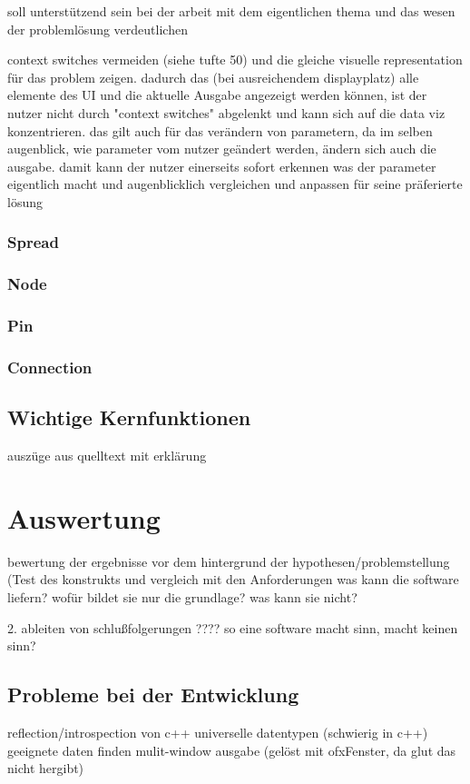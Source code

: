 \documentclass[a4paper, 12pt, DIVcalc, onepage, pdftex, headsepline, footsepline]{scrreprt}
\begin{document}
soll unterstützend sein bei der arbeit mit dem eigentlichen thema und das wesen der problemlösung verdeutlichen

context switches vermeiden (siehe tufte 50) und die gleiche visuelle representation für das problem zeigen.
dadurch das (bei ausreichendem displayplatz) alle elemente des UI und die aktuelle Ausgabe angezeigt werden
können, ist der nutzer nicht durch "context switches" abgelenkt und kann sich auf die data viz konzentrieren.
das gilt auch für das verändern von parametern, da im selben augenblick, wie parameter vom nutzer geändert werden, ändern sich auch die ausgabe.
damit kann der nutzer einerseits sofort erkennen was der parameter eigentlich macht und augenblicklich
vergleichen und anpassen für seine präferierte lösung
\subsection{Spread}
\subsection{Node}
\subsection{Pin}
\subsection{Connection}
\section{Wichtige Kernfunktionen}
\label{sec:Kernfunktionen}
auszüge aus quelltext mit erklärung
\chapter{Auswertung}
\label{cha:Auswertung}
bewertung der ergebnisse vor dem hintergrund der hypothesen/problemstellung (Test des konstrukts und vergleich mit den Anforderungen
was kann die software liefern? wofür bildet sie nur die grundlage? was kann sie nicht?

2. ableiten von schlußfolgerungen
????
so eine software macht sinn, macht keinen sinn?
\section{Probleme bei der Entwicklung}
\label{sec:Probleme}
reflection/introspection von c++
universelle datentypen (schwierig in c++)
geeignete daten finden
mulit-window ausgabe (gelöst mit ofxFenster, da glut das nicht hergibt)
\end{document}
